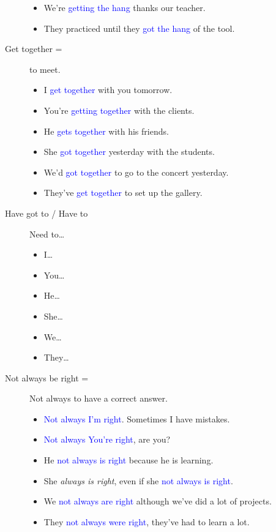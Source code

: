 \begin{multicols}{2}
\begin{description}
\begin{itemize}
\item We're \textcolor{blue}{getting the hang} thanks our teacher.
\item They practiced until they \textcolor{blue}{got the hang} of the tool.
\end{itemize}
\item [Get together =] to meet.
\begin{itemize}
\item I \textcolor{blue}{get together} with you tomorrow.
\item You're \textcolor{blue}{getting together} with the clients.
\item He \textcolor{blue}{gets together} with his friends.
\item She \textcolor{blue}{got together} yesterday with the students.
\item We'd \textcolor{blue}{got together} to go to the concert yesterday.
\item They've \textcolor{blue}{get together} to set up the gallery.
\end{itemize}

\item[Have got to / Have to] Need to\dots
\begin{itemize}
\item I\dots 
\item You\dots 
\item He\dots
\item She\dots
\item We\dots
\item They\dots
\end{itemize}

\item [Not always be right =] Not always to have a correct answer.
\begin{itemize}
\item \textcolor{blue}{Not always I'm right}. Sometimes I have mistakes.
\item \textcolor{blue}{Not always You're right}, are you?
\item He \textcolor{blue}{not always is right} because he is learning.
\item She \emph{always is right}, even if she \textcolor{blue}{not always is right}.
\item We \textcolor{blue}{not always are right} although we've did a lot of projects.
\item They \textcolor{blue}{not always were right}, they've had to learn a lot.
\end{itemize}


\end{description}
\end{multicols}
